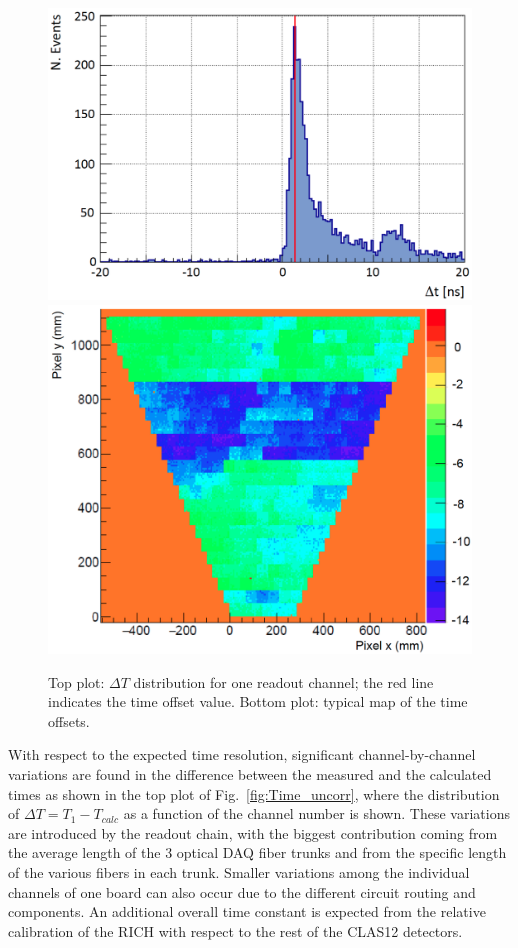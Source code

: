 \documentclass[5p,times,twocolumn]{elsarticle}
\begin{document}
\begin{figure}[t]
\begin{center}
\includegraphics[width=0.9\columnwidth]{Toffset_ch2913.png}
\includegraphics[width=0.95\columnwidth]{Offset_map.png}
\end{center}
\caption{Top plot: $\Delta T$ distribution for one readout channel; the red line indicates the time offset value.
  Bottom plot: typical map of the time offsets.}
\label{fig:Toffset}
\end{figure}

With respect to the expected time resolution, significant channel-by-channel variations are found in the difference
between the measured and the calculated times as shown in the top plot of Fig.~\ref{fig:Time_uncorr}, where the
distribution of $\Delta T=T_1-T_{calc}$ as a function of the channel number is shown. These variations are introduced
by the readout chain, with the biggest contribution coming from the average length of the 3 optical DAQ fiber trunks and
from the specific length of the various fibers in each trunk. Smaller variations among the individual channels of one
board can also occur due to the different circuit routing and components. An additional overall time constant is
expected from the relative calibration of the RICH with respect to the rest of the CLAS12 detectors.
\end{document}
